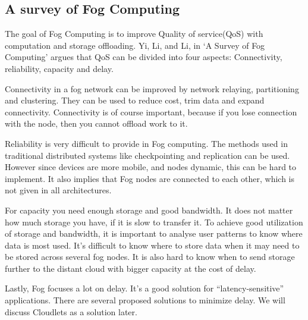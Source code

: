 \subsection{A survey of Fog Computing} %
The goal of Fog Computing is to improve Quality of service(QoS) with computation and storage offloading. Yi, Li, and Li, in ‘A Survey of Fog Computing’\cite{yi_survey_2015} argues that QoS can be divided into four aspects: Connectivity, reliability, capacity and delay.

Connectivity in a fog network can be improved by network relaying, partitioning and clustering. They can be used to reduce cost, trim data and expand connectivity. Connectivity is of course important, because if you lose connection with the node, then you cannot offload work to it. 

Reliability is very difficult to provide in Fog computing. The methods used in traditional distributed systems like checkpointing and replication can be used. However since devices are more mobile, and nodes dynamic, this can be hard to implement. It also implies that Fog nodes are connected to each other, which is not given in all architectures. 

For capacity you need enough storage and good bandwidth. It does not matter how much storage you have, if it is slow to transfer it. To achieve good utilization of storage and bandwidth, it is important to analyse user patterns to know where data is most used. It’s difficult to know where to store data when it may need to be stored across several fog nodes. It is also hard to know when to send storage further to the distant cloud with bigger capacity at the cost of delay. 

Lastly, Fog focuses a lot on delay. It’s a good solution for “latency-sensitive” applications. There are several proposed solutions to minimize delay. We will discuss Cloudlets as a solution later.





